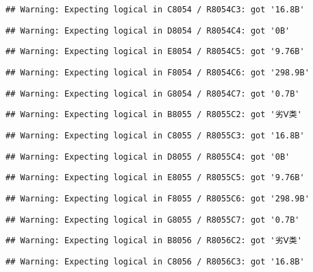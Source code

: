 \documentclass[
]{article}
\begin{document}
\begin{verbatim}
## Warning: Expecting logical in C8054 / R8054C3: got '16.8B'
\end{verbatim}

\begin{verbatim}
## Warning: Expecting logical in D8054 / R8054C4: got '0B'
\end{verbatim}

\begin{verbatim}
## Warning: Expecting logical in E8054 / R8054C5: got '9.76B'
\end{verbatim}

\begin{verbatim}
## Warning: Expecting logical in F8054 / R8054C6: got '298.9B'
\end{verbatim}

\begin{verbatim}
## Warning: Expecting logical in G8054 / R8054C7: got '0.7B'
\end{verbatim}

\begin{verbatim}
## Warning: Expecting logical in B8055 / R8055C2: got '劣Ⅴ类'
\end{verbatim}

\begin{verbatim}
## Warning: Expecting logical in C8055 / R8055C3: got '16.8B'
\end{verbatim}

\begin{verbatim}
## Warning: Expecting logical in D8055 / R8055C4: got '0B'
\end{verbatim}

\begin{verbatim}
## Warning: Expecting logical in E8055 / R8055C5: got '9.76B'
\end{verbatim}

\begin{verbatim}
## Warning: Expecting logical in F8055 / R8055C6: got '298.9B'
\end{verbatim}

\begin{verbatim}
## Warning: Expecting logical in G8055 / R8055C7: got '0.7B'
\end{verbatim}

\begin{verbatim}
## Warning: Expecting logical in B8056 / R8056C2: got '劣Ⅴ类'
\end{verbatim}

\begin{verbatim}
## Warning: Expecting logical in C8056 / R8056C3: got '16.8B'
\end{verbatim}
\end{document}
